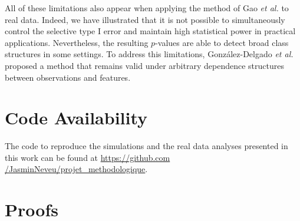 \documentclass[a4paper,11pt]{article}
\theoremstyle{plain}
\newcommand{\1}{\mathbf{1}}
\begin{document}
All of these limitations also appear when applying the method of Gao \textit{et al.} to real data. Indeed, we have illustrated that it is not possible to simultaneously control the selective type I error and maintain high statistical power in practical applications. Nevertheless, the resulting $p$-values are able to detect broad class structures in some settings. To address this limitations, González-Delgado \textit{et al.}~\cite{Gonzales} proposed a method that remains valid under arbitrary dependence structures between observations and features. 

\section*{Code Availability}
The code to reproduce the simulations and the real data analyses presented in this work can be found at \href{https://github.com/JasminNeveu/projet_methodologique}{https://github.com\\/JasminNeveu/projet\_methodologique}.

\appendix

\section{Proofs}\label{app:proofs}
\end{document}
